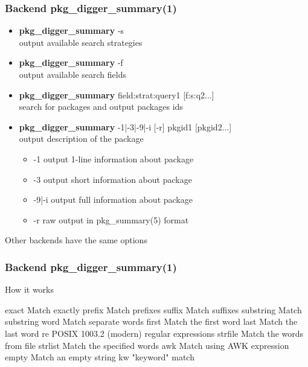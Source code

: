 \documentclass[hyperref=unicode,ascii,xcolor=dvipsnames]{beamer}
\begin{document}
\begin{frame}[fragile]
  \frametitle{Backend pkg\_digger\_summary(1)}
  \begin{itemize}
  \item {\bf pkg\_digger\_summary} -s\\
    output available search strategies
  \item {\bf pkg\_digger\_summary} -f\\
    output available search fields
  \item {\bf pkg\_digger\_summary} field:strat:query1 [f:s:q2...]\\
    search for packages and output packages ids
  \item {\bf pkg\_digger\_summary} -1|-3|-9|-i [-r] pkgid1 [pkgid2...]\\
    output description of the package
    \begin{itemize}
    \item -1         output 1-line information about package
    \item -3         output short information about package
    \item -9|-i      output full information about package
    \item -r         raw output in pkg\_summary(5) format
    \end{itemize}
  \end{itemize}
  Other backends have the same options
\end{frame}


\begin{frame}[fragile]
  \frametitle{Backend pkg\_digger\_summary(1)}
  \begin{block}{How it works}
    \begin{Code}{}
exact   Match exactly
prefix  Match prefixes
suffix  Match suffixes
substring       Match substring
word    Match separate words
first   Match the first word
last    Match the last word
re      POSIX 1003.2 (modern) regular expressions
strfile Match the words from file
strlist Match the specified words
awk     Match using AWK expression
empty   Match an empty string
kw      "keyword" match
\prompt{#}
    \end{Code}
  \end{block}
\end{frame}

\end{document}
